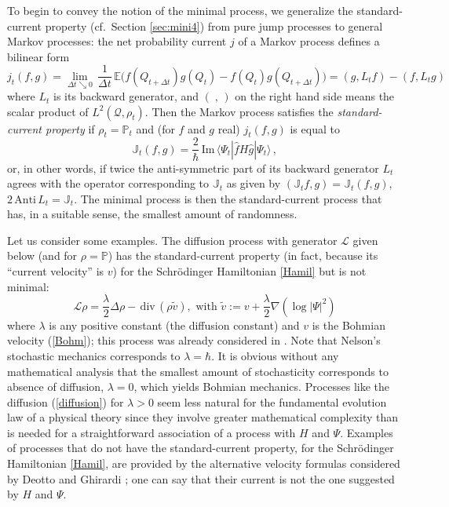 \documentclass[12pt]{article}
\newcommand{\EEE}{\mathbb{E}} %
\newcommand{\1}{\mathbf{1}} %
\newcommand{\Laplace}{\Delta} %
\renewcommand{\Im}{\mathrm{Im}} %
\renewcommand{\sp}[2]{\langle #1 | #2 \rangle} %
\newcommand{\conf}{\mathcal{Q}} %
\renewcommand{\div}{\,\mathrm{div}\,} %
\newcommand{\measure}{\mathbb{P}} %
\newcommand{\current}{\mathbb{J}}
\newcommand{\generator}{\mathscr{L}} %
\begin{document}
To  begin to convey the notion of the minimal process, we generalize
the standard-current property (cf.\ Section \ref{sec:mini4}) from pure
jump processes to general Markov processes: the net probability
current $j$ of a Markov process defines a bilinear form
\begin{equation}
   j_t(f,g) = \lim_{\Delta t \searrow 0} \, \frac{1}{\Delta t} \, \EEE
   \big( f(Q_{t+\Delta t}) g(Q_t) - f(Q_t) g(Q_{t + \Delta t}) \big)
   = (g,L_t f) - (f, L_t g)
\end{equation}
where $L_t$ is its backward generator, and $( \;, \, )$ on the right
hand side means the scalar product of $L^2(\conf, \rho_t)$.  Then the
Markov process satisfies the \emph{standard-current property} if
$\rho_t = \measure_t$ and (for $f$ and $g$ real) $j_t(f,g)$ is equal
to
\begin{equation}
   \current_t(f,g) = \frac{2}{\hbar} \, \Im \, \sp{\Psi_t} {\hat{f} H
   \hat{g} |\Psi_t}\,,
\end{equation}
or, in other words, if twice the anti-symmetric part of its backward
generator $L_t$ agrees with the operator corresponding to $\current_t$
as given by $(\current_t f,g) = \current_t(f,g)$, $2 \, \mathrm{Anti}
\, L_t = \current_t$.  The minimal process is then the
standard-current process that has, in a suitable sense, the smallest
amount of randomness.

Let us consider some examples. The diffusion process with generator
$\generator$ given below (and for $\rho = \measure$) has the
standard-current property (in fact, because its ``current velocity''
\cite{stochmech} is $v$)   for the Schr\"odinger Hamiltonian
\eqref{Hamil} but is not minimal:
\begin{equation}\label{diffusion}
   \generator \rho= \frac{\lambda}{2} \Laplace \rho -\div (\rho
   \tilde{v}),\mbox{ with } \tilde{v}:= v + \frac{\lambda}{2}
   \nabla(\log|\Psi|^2)
\end{equation}
where $\lambda$ is any positive constant (the diffusion constant) and
$v$ is the Bohmian velocity (\ref{Bohm}); this process was already
considered in \cite{Jaekel,Davidson}.  Note that Nelson's stochastic
mechanics \cite{stochmech} corresponds to $\lambda=\hbar$. It is
obvious without any mathematical analysis that the smallest amount of
stochasticity corresponds to absence of diffusion, $\lambda =0$, which
yields Bohmian mechanics.  Processes like the diffusion
(\ref{diffusion}) for $\lambda > 0$ seem less natural for the
fundamental evolution law of a physical theory since they involve
greater mathematical complexity than is needed for a straightforward
association of a process with $H$ and $\Psi$.  Examples of processes
that do not have the standard-current property, for the Schr\"odinger
Hamiltonian \eqref{Hamil}, are provided by the alternative velocity
formulas considered by Deotto and Ghirardi \cite{Deotto}; one can say
that their current is not the one suggested by $H$ and $\Psi$.
\end{document}
